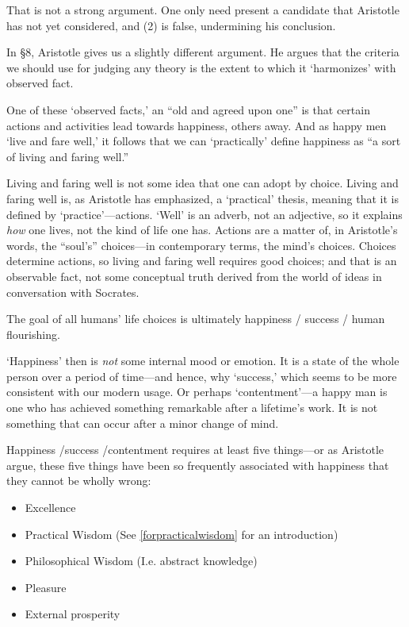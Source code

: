 That is not a strong argument. One only need present a candidate that Aristotle has not yet considered, and (2) is false, undermining his conclusion.

 In \S8, Aristotle gives us a slightly different argument. He argues that the criteria we should use for judging any theory is the extent to which it `harmonizes' with observed fact. ~\citep[1098a10--11]{Aristotle:1995uq}

One of these `observed facts,' an ``old and agreed upon one'' is that certain actions and activities lead towards happiness, others away. And as happy men `live and fare well,' it follows that we can `practically' define happiness as ``a sort of living and faring well.'' ~\citep[1098a18--22]{Aristotle:1995uq}

Living and faring well is not some idea that one can adopt by choice. Living and faring well is, as Aristotle has emphasized, a `practical' thesis, meaning that it is defined by `practice'---actions. `Well' is an adverb, not an adjective, so it explains \emph{how} one lives, not the kind of life one has. Actions are a matter of, in Aristotle's words, the ``soul's'' choices---in contemporary terms, the mind's choices. Choices determine actions, so living and faring well requires good choices; and that is an observable fact, not some conceptual truth derived from the world of ideas in conversation with Socrates.
\begin{thesis}\label{thesis:aristotle1}
The goal of all humans' life choices is ultimately happiness / success / human flourishing.  
\end{thesis}

`Happiness' then is \emph{not} some internal mood or emotion. It is a state of the whole person over a period of time---and hence, why `success,' which seems to be more consistent with our modern usage. Or perhaps `contentment'---a happy man is one who has achieved something remarkable after a lifetime's work. It is not something that can occur after a minor change of mind.

Happiness \slash  success \slash  contentment requires at least five things---or as Aristotle argue, these five things have been so frequently associated with happiness that they cannot be wholly wrong: 

\begin{itemize}
\item Excellence

\item Practical Wisdom (See \ref{forpracticalwisdom} for an introduction)

\item Philosophical Wisdom (I.e. abstract knowledge)

\item Pleasure

\item External prosperity ~\citep[1098b26--206]{Aristotle:1995uq}

\end{itemize}

